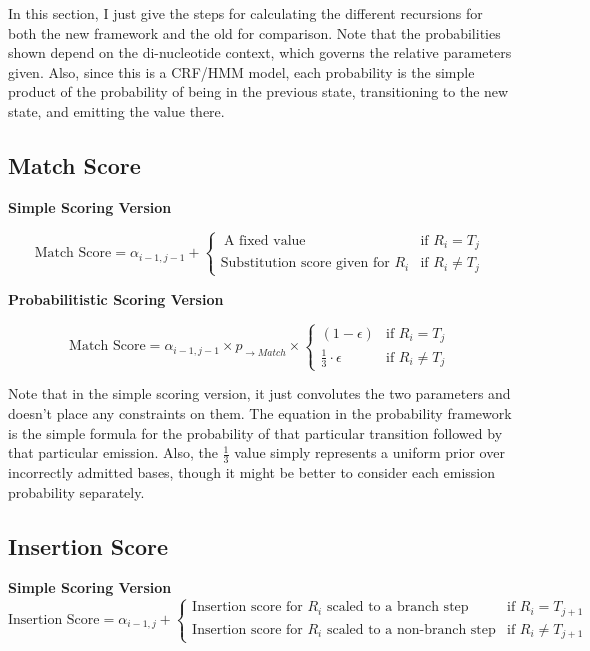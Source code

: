 \documentclass[paper=a4, fontsize=11pt]{scrartcl}
\numberwithin{equation}{section}		%
\numberwithin{figure}{section}			%
\numberwithin{table}{section}				%
\begin{document}
In this section, I just give the steps for calculating the different recursions for both the new framework and the old for comparison.  Note that the probabilities shown depend on the di-nucleotide context, which governs the relative parameters given.  Also, since this is a CRF/HMM model, each probability is the simple product of the probability of being in the previous state, transitioning to the new state, and emitting the value there.

\subsection{\textbf{Match Score}}


\textbf{Simple Scoring Version}

\[
	\text{Match Score} = \alpha_{i-1,j-1}  +  \begin{cases}
							 \ \text{A fixed value} & \text{if }  R_{i} = T_{j} \\
							 \text{Substitution score given for } R_{i} & \text{if }  R_{i}  \neq T_{j} 
							 \end{cases}
\]

\textbf{Probabilitistic Scoring Version}

\[
	\text{Match Score} = \alpha_{i-1,j-1}  \times p_{\rightarrow Match} \times  \begin{cases}
							 (1 - \epsilon) & \text{if }  R_{i} = T_{j} \\
							 \frac{1}{3} \cdot \epsilon & \text{if }  R_{i}  \neq T_{j} 
							 \end{cases}
\]

Note that in the simple scoring version, it just convolutes the two parameters and doesn't place any constraints on them.  The equation in the probability framework is the simple formula for the probability of that particular transition followed by that particular emission.  Also, the $\frac{1}{3}$ value simply represents a uniform prior over incorrectly admitted bases, though it might be better to consider each emission probability separately.


 
\subsection{\textbf{Insertion Score}}


\textbf{Simple Scoring Version}
\[
	\text{Insertion Score} = \alpha_{i-1,j}  +  \begin{cases}
							 \text{Insertion score  for } R_{i} \text{ scaled to a branch step} & \text{if }  R_{i} = T_{j+1} \\
							 \text{Insertion score  for } R_{i} \text{ scaled to a non-branch step} & \text{if }  R_{i}  \neq T_{j+1} 
							 \end{cases}
\]
\end{document}
